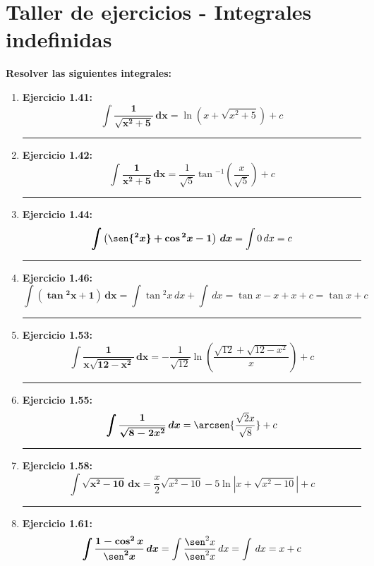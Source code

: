 \documentclass[12pt]{article}
\begin{document}
    

    \section*{\centering Taller de ejercicios - Integrales indefinidas} \vspace{0.5cm}

    \textbf{Resolver las siguientes integrales: } \vspace{0.5cm}

    \begin{enumerate}[label=\textbf{\arabic*)}] 
        \hrule %
        \item \textbf{Ejercicio 1.41: }\[\bm{\int \frac{1}{\sqrt{x^2 + 5}} \, dx} = \ln{\left(x + \sqrt{x^2 + 5}\right)} + c\]
            
        
        \hrule %
        \item \textbf{Ejercicio 1.42: } \[\bm{\int \frac{1}{x^2 + 5} \, dx} = \frac{1}{\sqrt{5}} \tan{^{-1} \left(\frac{x}{\sqrt{5}}\right)} + c\]

        \hrule %
        \item \textbf{Ejercicio 1.44: } \[\bm{\int \left(\sen{^2x} + \cos{^2x} - 1\right) \, dx} = \int 0 \, dx = c\]


        \hrule %
        \item \textbf{Ejercicio 1.46: } \[\bm{\int (\tan{^2x} + 1) \, dx} = \int \tan{^2x} \, dx + \int \, dx = \tan{x} - x + x + c = \tan{x} + c\]


        \hrule %
        \item \textbf{Ejercicio 1.53: } \[\bm{\int \frac{1}{x\sqrt{12 - x^2}} \, dx} = -\frac{1}{\sqrt{12}} \ln{\left(\frac{\sqrt{12} + \sqrt{12 - x^2}}{x}\right)} + c\]


        \hrule %
        \item \textbf{Ejercicio 1.55:} \[\bm{\int \frac{1}{\sqrt{8 - 2x^2}} \, dx} = \arcsen{\frac{\sqrt{2}x}{\sqrt{8}}} + c\]


        \hrule %
        \item \textbf{Ejercicio 1.58: } \[\bm{\int \sqrt{x^2 - 10} \, dx} = \frac{x}{2}\sqrt{x^2 - 10} - 5\ln{\left| x + \sqrt{x^2 - 10} \right|} + c\]


        \hrule %
        \item \textbf{Ejercicio 1.61: } \[\bm{\int \frac{1 - \cos^2{x}}{\sen^2{x}} \, dx} = \int \frac{\sen^2{x}}{\sen^2{x}} \, dx = \int \, dx = x + c\]



\end{enumerate}
\end{document}
